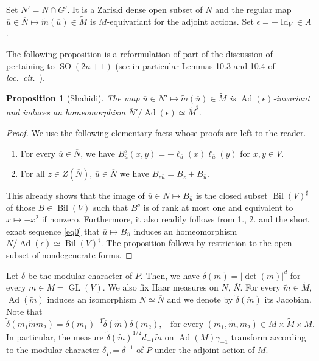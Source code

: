 \documentclass[12pt]{article}
\newtheorem{prop}{Proposition}[section]
\numberwithin{equation}{section}
\def\tM{\widetilde{M}}
\def\tm{\widetilde{m}}
\def\ou{\overline{u}}
\def\oN{\overline{N}}
\DeclareMathOperator{\Ad}{Ad}
\DeclareMathOperator{\Bil}{Bil}
\DeclareMathOperator{\Id}{Id}
\DeclareMathOperator{\GL}{\mathrm{GL}}
\DeclareMathOperator{\SO}{\mathrm{SO}}
\begin{document}
	Set $\oN'=\oN\cap G'$. It is a Zariski dense open subset of $\oN$ and the regular map $\ou\in \oN\mapsto \tm(\ou)\in \tM$ is $M$-equivariant for the adjoint actions. Set $\epsilon=-\Id_V\in A$.
	
	The following proposition is a reformulation of part of the discussion of \cite[\S 10]{Shaend} pertaining to $\SO(2n+1)$ (see in particular Lemmas 10.3 and 10.4 of {\em loc.\ cit.}\ ).
	
	\begin{prop}[Shahidi]
		The map $\ou\in \oN'\mapsto \tm(\ou)\in \tM$ is $\Ad(\epsilon)$-invariant and induces an homeomorphism $\oN'/\Ad(\epsilon)\simeq \tM^\sharp$.
	\end{prop}
	
	\begin{proof}
		We use the following elementary facts whose proofs are left to the reader.
		\begin{enumerate}
			\item For every $\ou\in \oN$, we have $B_{\ou}^s(x,y)=-\ell_{\ou}(x)\ell_{\ou}(y)$ for $x,y\in V$.
			
			\item For all $z\in Z(\oN)$, $\ou\in \oN$ we have $B_{z\ou}=B_z+B_{\ou}$.
		\end{enumerate}
		This already shows that the image of $\ou\in \oN\mapsto B_{\ou}$ is the closed subset $\Bil(V)^\sharp$ of those $B\in \Bil(V)$ such that $B^s$ is of rank at most one and equivalent to $x\mapsto -x^2$ if nonzero. Furthermore, it also readily follows from 1., 2. and the short exact sequence \eqref{eq0} that $\ou\mapsto B_{\ou}$ induces an homeomorphism $\oN/\Ad(\epsilon)\simeq  \Bil(V)^\sharp$. The proposition follows by restriction to the open subset of nondegenerate forms.
	\end{proof}
	
	Let $\delta$ be the modular character of $P$. Then, we have $\delta(m)=\lvert \det(m)\rvert^{d}$ for every $m\in M=\GL(V)$. We also fix Haar measures on $N$, $\oN$. For every $\tm\in \tM$, $\Ad(\tm)$ induces an isomorphism $N\simeq \oN$ and we denote by $\widetilde{\delta}(\tm)$ its Jacobian. Note that
	\begin{equation}\label{eq tildedelta}
		\displaystyle \widetilde{\delta}(m_1\tm m_2)=\delta(m_1)^{-1}\widetilde{\delta}(\tm)\delta(m_2),\;\; \mbox{ for every } (m_1,\tm,m_2)\in M\times \tM\times M.
	\end{equation}
	In particular, the measure $\widetilde{\delta}(\tm)^{1/2} d_{-1} \tm$ on $\Ad(M)\gamma_{-1}$ transform according to the modular character $\delta_{\overline{P}}=\delta^{-1}$ of $\overline{P}$ under the adjoint action of $M$.
	
\end{document}
